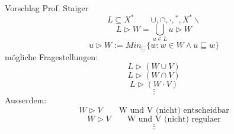 \documentclass[11pt]{article}
\author{Robert Hartmann}
\newcommand{\ff}{\triangleright}
\begin{document}
Vorschlag Prof. Staiger\\
$$L\subseteq X^*\qquad \cup, \cap, \cdot, {}^*, X^*\backslash$$
$$L\triangleright W = \bigcup_{u\in L} u\triangleright W$$
\vspace{5mm}
$$u\triangleright W := Min_{\sqsubseteq} \{w:w\in W \wedge u\sqsubseteq w\}$$
mögliche Fragestellungen:
$$L\ff (W\cup V)$$
$$L\ff (W\cap V)$$
$$L\ff (W\cdot V)$$
$$\vdots$$
Ausserdem:
$$W\ff V\qquad\text{W und V (nicht) entscheidbar}$$
$$W\ff V\qquad\text{W und V (nicht) regulaer}$$
$$\vdots$$
\end{document}
